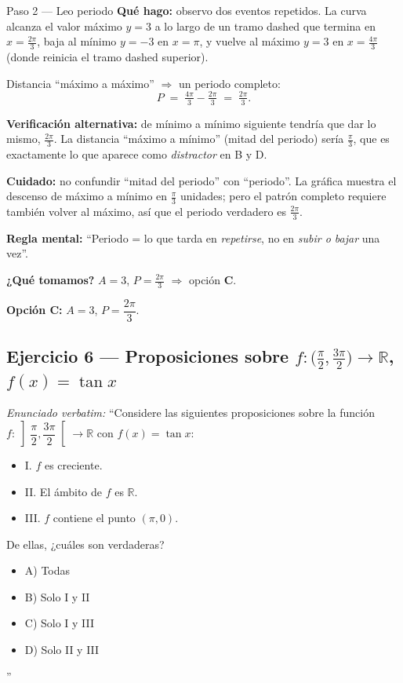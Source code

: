 \documentclass[11pt]{article}
\begin{document}
\begin{paso}{Paso 2 --- Leo periodo}
\textbf{Qué hago:} observo dos eventos repetidos. La curva alcanza el valor máximo $y=3$ a lo largo de un tramo dashed que termina en $x=\tfrac{2\pi}{3}$, baja al mínimo $y=-3$ en $x=\pi$, y vuelve al máximo $y=3$ en $x=\tfrac{4\pi}{3}$ (donde reinicia el tramo dashed superior).

Distancia ``máximo a máximo'' $\Rightarrow$ un periodo completo:
\[
P \;=\; \tfrac{4\pi}{3} - \tfrac{2\pi}{3} \;=\; \tfrac{2\pi}{3}.
\]

\textbf{Verificación alternativa:} de mínimo a mínimo siguiente tendría que dar lo mismo, $\tfrac{2\pi}{3}$. La distancia ``máximo a mínimo'' (mitad del periodo) sería $\tfrac{\pi}{3}$, que es exactamente lo que aparece como \emph{distractor} en B y D.

\textbf{Cuidado:} no confundir ``mitad del periodo'' con ``periodo''. La gráfica muestra el descenso de máximo a mínimo en $\tfrac{\pi}{3}$ unidades; pero el patrón completo requiere también volver al máximo, así que el periodo verdadero es $\tfrac{2\pi}{3}$.

\textbf{Regla mental:} ``Periodo = lo que tarda en \emph{repetirse}, no en \emph{subir o bajar} una vez''.

\textbf{¿Qué tomamos?} $A=3$, $P=\tfrac{2\pi}{3}$ $\Rightarrow$ opción \textbf{C}.
\end{paso}

\begin{resp}
\textbf{Opción C:} $A=3$, $P=\dfrac{2\pi}{3}$.
\end{resp}

\subsection*{Ejercicio 6 --- Proposiciones sobre $f:\bigl(\tfrac{\pi}{2},\tfrac{3\pi}{2}\bigr)\to\mathbb{R}$, $f(x)=\tan x$}

\textit{Enunciado verbatim:} ``Considere las siguientes proposiciones sobre la función $f:\left]\dfrac{\pi}{2},\dfrac{3\pi}{2}\right[\to\mathbb{R}$ con $f(x)=\tan x$:
\begin{itemize}[label={},leftmargin=2em,topsep=2pt,itemsep=0pt]
  \item I. $f$ es creciente.
  \item II. El ámbito de $f$ es $\mathbb{R}$.
  \item III. $f$ contiene el punto $(\pi,0)$.
\end{itemize}
De ellas, ¿cuáles son verdaderas?
\begin{itemize}[label={},leftmargin=2em,topsep=2pt,itemsep=0pt]
  \item A) Todas
  \item B) Solo I y II
  \item C) Solo I y III
  \item D) Solo II y III
\end{itemize}''
\end{document}
